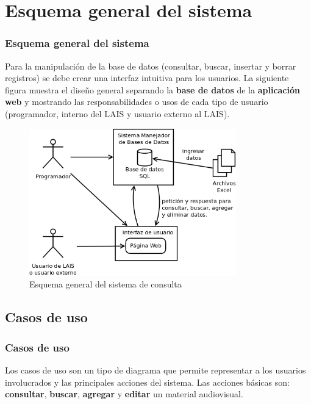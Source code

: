 \documentclass{beamer}
\begin{document}
\section{Esquema general del sistema}
\begin{frame}
	\frametitle{Esquema general del sistema}
	Para la manipulación de la base de datos (consultar, buscar, insertar y borrar registros) se debe crear una interfaz intuitiva para los usuarios.
	La siguiente figura muestra el diseño general separando la \textbf{base de datos} de la \textbf{aplicación web} y mostrando las responsabilidades o usos de cada tipo de usuario (programador, interno del LAIS y usuario externo al LAIS).
\end{frame}

\begin{frame}
	\begin{figure}[H]
		\centering
		\includegraphics[width=0.8\textwidth]{EsquemaGeneral.png}
		\caption{Esquema general del sistema de consulta}
		\label{fig:esquema_general}
	\end{figure}
\end{frame}

\subsection{Casos de uso}
\begin{frame}
	\frametitle{Casos de uso}
	Los casos de uso son un tipo de diagrama que permite representar a los usuarios involucrados y las principales acciones del sistema.
	Las acciones básicas son: \textbf{consultar}, \textbf{buscar}, \textbf{agregar} y \textbf{editar} un material audiovisual.
\end{frame}
\end{document}
